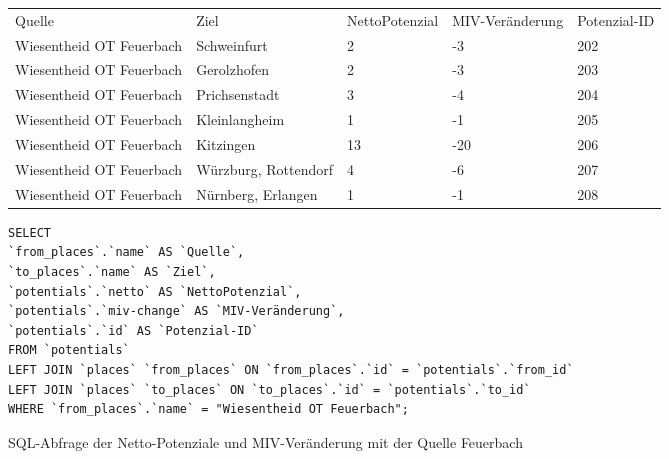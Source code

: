 \begin{tabular}{ l  l  l  l  l }
Quelle & Ziel & NettoPotenzial & MIV-Veränderung & Potenzial-ID\\ 
Wiesentheid OT Feuerbach & Schweinfurt & 2 & -3 & 202\\ 
Wiesentheid OT Feuerbach & Gerolzhofen & 2 & -3 & 203\\ 
Wiesentheid OT Feuerbach & Prichsenstadt & 3 & -4 & 204\\ 
Wiesentheid OT Feuerbach & Kleinlangheim & 1 & -1 & 205\\ 
Wiesentheid OT Feuerbach & Kitzingen & 13 & -20 & 206\\ 
Wiesentheid OT Feuerbach & Würzburg, Rottendorf & 4 & -6 & 207\\ 
Wiesentheid OT Feuerbach & Nürnberg, Erlangen & 1 & -1 & 208\\ 
\end{tabular}
\newline
\newline
\begin{listing}[htbp]
\begin{verbatim}
SELECT
`from_places`.`name` AS `Quelle`, 
`to_places`.`name` AS `Ziel`, 
`potentials`.`netto` AS `NettoPotenzial`, 
`potentials`.`miv-change` AS `MIV-Veränderung`, 
`potentials`.`id` AS `Potenzial-ID`
FROM `potentials`
LEFT JOIN `places` `from_places` ON `from_places`.`id` = `potentials`.`from_id`
LEFT JOIN `places` `to_places` ON `to_places`.`id` = `potentials`.`to_id`
WHERE `from_places`.`name` = "Wiesentheid OT Feuerbach";
\end{verbatim}
\caption{SQL-Abfrage der Netto-Potenziale und MIV-Veränderung mit der Quelle Feuerbach}\label{lst-fz-feuerbach}
\end{listing}